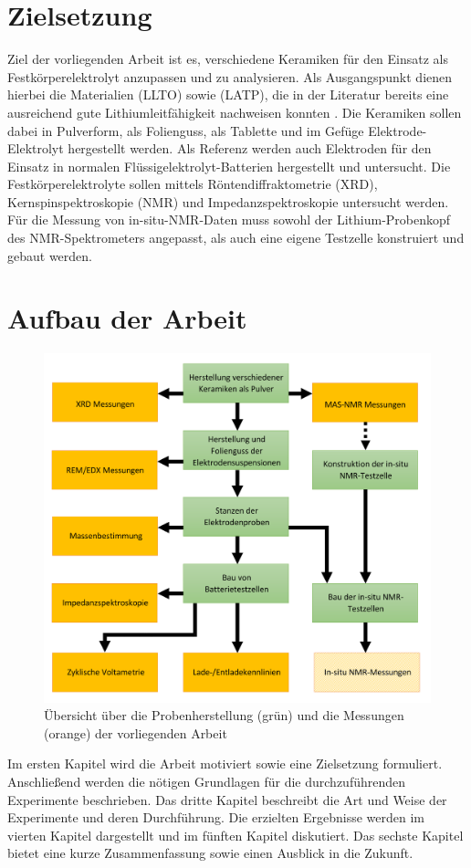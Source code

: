 \documentclass[a4paper, 11pt, headsepline,footsepline,twoside,abstract]{scrbook}
\begin{document}
\section{Zielsetzung}
Ziel der vorliegenden Arbeit ist es, verschiedene Keramiken für den Einsatz als Festkörperelektrolyt anzupassen und zu analysieren. Als Ausgangspunkt dienen hierbei die Materialien  (LLTO) sowie  (LATP), die in der Literatur bereits eine ausreichend gute Lithiumleitfähigkeit nachweisen konnten \cite{tatsumisago2013recent}. Die Keramiken sollen dabei in Pulverform, als Folienguss, als Tablette und im Gefüge Elektrode-Elektrolyt hergestellt werden. Als Referenz werden auch Elektroden für den Einsatz in normalen Flüssigelektrolyt-Batterien hergestellt und untersucht. Die Festkörperelektrolyte sollen mittels Röntendiffraktometrie (XRD), Kernspinspektroskopie (NMR) und Impedanzspektroskopie untersucht werden. Für die Messung von in-situ-NMR-Daten muss sowohl der Lithium-Probenkopf des NMR-Spektrometers angepasst, als auch eine eigene Testzelle konstruiert und gebaut werden.
\section{Aufbau der Arbeit}
\begin{figure}
	\centering
	\includegraphics[width=1.0\columnwidth]{images/Flowchart_Masterarbeit2.png}
	\caption{Übersicht über die Probenherstellung (grün) und die Messungen (orange) der vorliegenden Arbeit}
	\label{Flowchart_Masterarbeit}
\end{figure}
Im ersten Kapitel wird die Arbeit motiviert sowie eine Zielsetzung formuliert. Anschließend werden die nötigen Grundlagen für die durchzuführenden Experimente beschrieben. Das dritte Kapitel beschreibt die Art und Weise der Experimente und deren Durchführung. Die erzielten Ergebnisse werden im vierten Kapitel dargestellt und im fünften Kapitel diskutiert. Das sechste Kapitel bietet eine kurze Zusammenfassung sowie einen Ausblick in die Zukunft.
\end{document}
